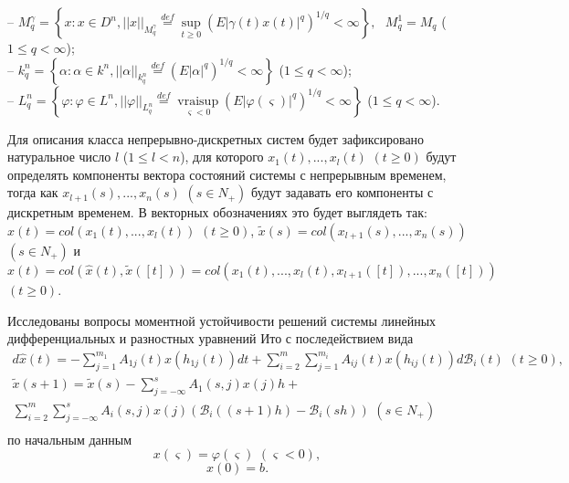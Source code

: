 --
$ M_q^{\gamma } = \left \{x: x \in D^n, ||x||_{M_q^\gamma }
 \mathrel
 {\mathop {=} \limits ^{def}} \mathrel {\mathop {\sup}
 \limits _{t
 \ge 0}} (E|\gamma (t)x(t)|^q)^{1/q} < \infty \right \},  \ \ \
 M_q^1 =  M_q$ ($1\le q <\infty$);\\
 -- $k_q^n = \left \{\alpha: \alpha \in k^n, ||\alpha ||_{k_q^n}
 \mathrel
 {\mathop {=} \limits ^{def}} (E|\alpha |^q)^{1/q} < \infty
 \right  \}$ ($1\le q <\infty$);\\
 -- $ L_q^n = \left \{\varphi: \varphi \in L^n,
 ||\varphi||_{L_q^n}
 \mathrel {\mathop {=} \limits ^{def}} \mathrel {\mathop
 {vrai \sup}
 \limits _{\varsigma < 0}}(E|\varphi (\varsigma ) |^q)^{1/q} < \infty
 \right \}$ ($1\le q <\infty$).


Для описания класса непрерывно-дискретных систем будет зафиксировано
натуральное число $l$ ($1 \le l < n$), для которого $x_1(t), ...,
x_l(t)$ $ (t \ge 0)$ будут определять компоненты вектора состояний
системы с непрерывным временем, тогда как $x_{l+1}(s), ..., x_n(s)$
$(s \in N_+)$ будут задавать его компоненты с дискретным временем. В
векторных обозначениях это будет выглядеть так: $\hat x(t) = col
(x_1(t), ..., x_l(t))$ $(t \ge 0)$, $\tilde x(s) = col(x_{l+1}(s),
..., x_n(s))$ $ (s \in N_+)$ и $x(t) = col(\hat x(t), \tilde x([t]))
= col (x_1(t), ..., x_l(t), x_{l+1}([t]), ..., x_n([t]))$ $ (t \ge
0)$.


Исследованы вопросы моментной устойчивости решений системы линейных
дифференциальных и разностных уравнений Ито с последействием вида
\begin{equation}\label{kri-1}
\begin {array}{crl}
 d\hat x(t) = - \sum
 \limits_{j=1}^{m_1}A_{1j}(t)x(h_{1j}(t))dt +
 \sum \limits_{i=2}^m\sum \limits_{j=1}^{m_i}
 A_{ij}(t)x(h_{ij}(t))d\mathcal B_i(t) \, \, (t \ge 0),\\
\tilde x(s+1) = \tilde x(s) - \sum \limits _{j=-\infty }^{s}
A_{1}(s,j)x(j)h + \\
\sum \limits _{i=2}^{m}\sum \limits _{j=-\infty }^{s}
A_{i}(s,j)x(j)(\mathcal B_i((s+1)h) - \mathcal B_i(sh))\, \,  (s
\in N_+)\\
\end {array}
\end{equation}
по начальным данным
\begin{equation}\label{kri-1a}
x(\varsigma)=\varphi (\varsigma) {\,} {\,} (\varsigma < 0),
\end{equation}
\begin{equation}\label{kri-1b}
x(0) = b.
\end{equation}

